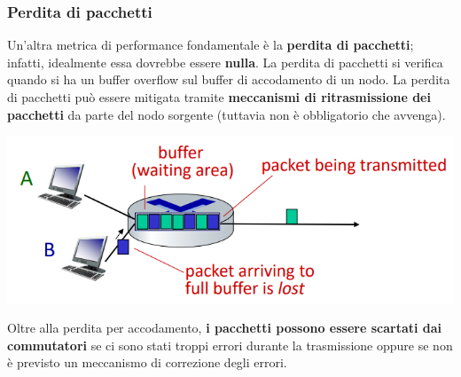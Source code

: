 \documentclass[12pt]{article}
\begin{document}
\subsubsection{Perdita di pacchetti}
Un'altra metrica di performance fondamentale è la \textbf{perdita di pacchetti}; infatti, idealmente essa dovrebbe essere \textbf{nulla}.
La perdita di pacchetti si verifica quando si ha un buffer overflow sul buffer di accodamento di un nodo.
La perdita di pacchetti può essere mitigata tramite \textbf{meccanismi di ritrasmissione dei pacchetti} da parte del nodo sorgente (tuttavia non è obbligatorio che avvenga).
\begin{center}
    \includegraphics[width =0.70\linewidth]{Images/21.PNG}
\end{center}
Oltre alla perdita per accodamento, \textbf{i pacchetti possono essere scartati dai commutatori} se ci sono stati troppi errori durante la trasmissione oppure se non è previsto un meccanismo di correzione degli errori.
\end{document}
